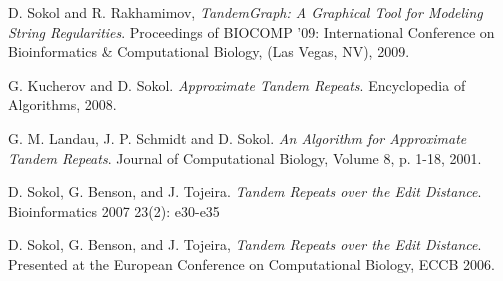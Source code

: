 \documentclass[a4paper, 12pt]{article}
\begin{document}
 

\begin{thebibliography}{9}
  D. Sokol and R. Rakhamimov,
  \emph{TandemGraph: A Graphical Tool for Modeling String Regularities}.
  Proceedings of BIOCOMP '09: International Conference on Bioinformatics \& Computational Biology, 
  (Las Vegas, NV), 2009.
 
  G. Kucherov and D. Sokol. 
  \emph{Approximate Tandem Repeats}. 
  Encyclopedia of Algorithms, 2008.

  G. M. Landau, J. P. Schmidt and D. Sokol. 
  \emph{An Algorithm for Approximate Tandem Repeats}. 
  Journal of Computational Biology, 
  Volume 8, p. 1-18, 2001.

  D. Sokol, G. Benson, and J. Tojeira. 
  \emph{Tandem Repeats over the Edit Distance}. 
  Bioinformatics 2007 23(2): e30-e35

  D. Sokol, G. Benson, and J. Tojeira, 
  \emph{Tandem Repeats over the Edit Distance}. 
  Presented at the European Conference on Computational Biology, 
  ECCB 2006.
\end{thebibliography}
\end{document}
